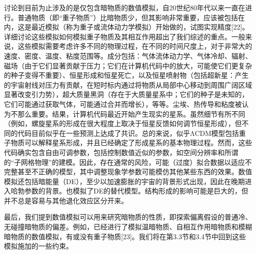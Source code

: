 讨论到目前为止涉及的是仅包含暗物质的数值模拟，自20世纪80年代以来一直在进行。普通物质（即“重子物质”）比暗物质少，但其影响非常重要，应该被包括在内，这是最近模拟（称为重子或流体动力学模拟）开始做的，试图实现精度[22]。详细讨论这些模拟如何模拟重子物质及其相互作用超出了我们综述的重点。一般来说，这些模拟需要考虑许多不同的物理过程，在不同的时间尺度上，对于非常大的速度、密度、温度、粘度范围等。成分包括：气体流体动力学、气体冷却、辐射、磁场（由于它们显著贡献于压力；它们在计算机代码中的放大，可能使它们更复杂的种子变得不重要）、恒星形成和恒星死亡，以及恒星喷射物（包括超新星：产生的宇宙射线对压力有贡献，在短时标内通过将物质从局部中心移动到周围广阔区域显著改变引力势），超大质量黑洞（存在于大质量星系中；它们的种子是未知的，它们可能通过获取气体，可能通过合并而增长），等等。尘埃、热传导和粘度被认为不那么重要。结果，计算机代码最近开始产生现实的星系。虽然细节有所不同（例如，螺旋星系的形成在很大程度上取决于恒星反馈如何调节恒星形成），但不同的代码目前似乎在一些预测上达成了共识。总的来说，似乎ΛCDM模型包括重子物质可以解释星系形成，并且已经确定了形成星系的基本物理过程。然而，这些代码确实包含自由可调参数，包括控制数值近似的参数，如空间分辨率和所谓的“子网格物理”的建模。因此，存在通常的风险，可能（过度）拟合数据以适应不完整甚至不正确的模型，其中调整现象学参数可能模仿其他某些东西的效果。数值模拟还包括暗能量（DE），至少以加速膨胀的宇宙的背景形式出现，因此在晚期进入哈勃参数的背景。也模拟了DE的替代模型。结构形成的影响可能是巨大的，但并不总是容易与其他退化效应区分开来。

最后，我们提到数值模拟可以用来研究暗物质的性质，即探索偏离假设的普通冷、无碰撞暗物质的偏差。例如，已经进行了模拟温暗物质、自相互作用暗物质和模糊暗物质的数值模拟，有或没有重子物质[23]。我们将在第3.3节和3.4节中回到这些模拟施加的一些约束。

